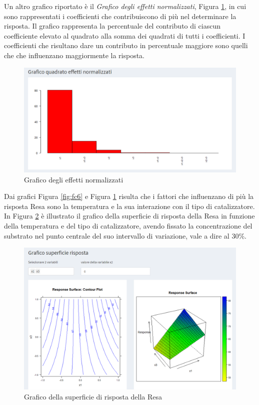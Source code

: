 \documentclass[
  11pt,
]{book}
\begin{document}
Un altro grafico riportato è il \emph{Grafico degli effetti normalizzati},
Figura \ref{fig:fc7}, in cui sono rappresentati i coefficienti che
contribuiscono di più nel determinare la risposta. Il grafico
rappresenta la percentuale del contributo di ciascun coefficiente
elevato al quadrato alla somma dei quadrati di tutti i coefficienti. I
coefficienti che risultano dare un contributo in percentuale maggiore
sono quelli che che influenzano maggiormente la risposta.

\begin{figure}

{\centering \includegraphics[width=1\linewidth]{Immagini/Fatt_compl/07_coeff_norm} 

}

\caption{Grafico degli effetti normalizzati}\label{fig:fc7}
\end{figure}

Dai grafici Figura \ref{fig:fc6} e Figura \ref{fig:fc7} risulta che i fattori
che influenzano di più la risposta Resa sono la temperatura e la sua
interazione con il tipo di catalizzatore.\\
In Figura \ref{fig:fc8} è illustrato il grafico della superficie di
risposta della Resa in funzione della temperatura e del tipo di
catalizzatore, avendo fissato la concentrazione del substrato nel punto
centrale del suo intervallo di variazione, vale a dire al 30\%.

\begin{figure}

{\centering \includegraphics[width=1\linewidth]{Immagini/Fatt_compl/08_sup_risp} 

}

\caption{Grafico della superficie di risposta della Resa}\label{fig:fc8}
\end{figure}
\end{document}
